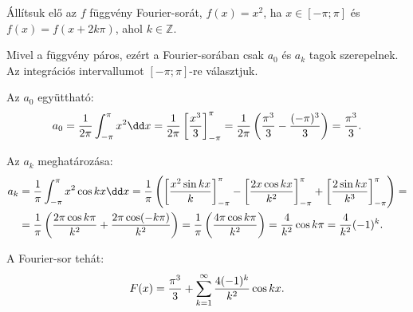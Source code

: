 \begin{example}
  \bgroup\sffamily
  Állítsuk elő az $f$ függvény Fourier-sorát, $f(x) = x^2$, ha
  $x \in [-\pi; \pi]$ és $f(x) = f(x + 2k\pi)$, ahol $k \in \mathbb Z$.
  \egroup

  \hdashrule[.8ex][x]{\dimexpr\textwidth}{1pt}{2mm 3pt}

  Mivel a függvény páros, ezért a Fourier-sorában csak $a_0$ és $a_k$ tagok
  szerepelnek. Az integrációs intervallumot $[-\pi; \pi]$-re választjuk.

  Az $a_0$ együttható:
  $$
    a_0 = \frac{1}{2\pi} \int_{-\pi}^{\pi} x^2 \dd x
    = \frac{1}{2\pi} \left[ \frac{x^3}{3} \right]_{-\pi}^{\pi}
    = \frac{1}{2\pi} \left( \frac{\pi^3}{3} - \frac{(-\pi)^3}{3} \right)
    = \frac{\pi^3}{3}
    \text.
    $$

      Az $a_k$ meghatározása:
      \begin{align*}
        a_k
         & = \frac{1}{\pi} \int_{-\pi}^{\pi} x^2 \cos kx \dd x
        = \frac{1}{\pi} \left(
        \left[\frac{x^2 \sin kx}{k}\right]_{-\pi}^{\pi}
        - \left[\frac{2x \cos kx}{k^2}\right]_{-\pi}^{\pi}
        + \left[\frac{2 \sin kx}{k^3}\right]_{-\pi}^{\pi}
        \right) =
        \\
         & = \frac{1}{\pi} \left(
        \frac{2\pi \cos k\pi}{k^2} + \frac{2\pi \cos (-k\pi)}{k^2}
        \right) = \frac{1}{\pi} \left(
        \frac{4\pi \cos k\pi}{k^2}
        \right) = \frac{4}{k^2} \cos k\pi
        = \frac{4}{k^2} (-1)^k
        \text.
      \end{align*}

      A Fourier-sor tehát:
    $$
    F(x) = \frac{\pi^3}{3} + \sum_{k=1}^{\infty} \frac{4(-1)^k}{k^2} \cos kx
    \text.
  $$
\end{example}
